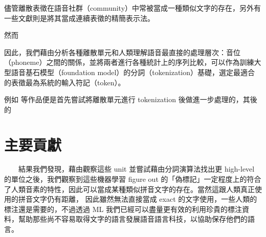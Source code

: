    儘管離散表徵在語音社群（community）中常被當成一種類似文字的存在，另外有一些文獻則是將其當成連續表徵的精簡表示法。

    然而

    因此，我們藉由分析各種離散單元和人類理解語音最直接的處理層次：音位（phoneme）之間的關係，並將兩者進行各種統計上的序列比較，可以作為訓練大型語音基石模型（foundation model）的分詞（tokenization）基礎，選定最適合的表徵最為系統的輸入符記（token）。

    例如 \cite{wu2023wav2seq} 等作品便是首先嘗試將離散單元進行 tokenization 後做進一步處理的，其後的



\section{主要貢獻}  %

　　結果我們發現，藉由觀察這些 unit 並嘗試藉由分詞演算法找出更 high-level 的單位之後，我們觀察到這些機器學習 figure out 的「偽標記」一定程度上的符合了人類音素的特性，因此可以當成某種類似拼音文字的存在。當然這跟人類真正使用的拼音文字仍有距離，
因此雖然無法直接當成 exact 的文字使用，一些人類的標注還是需要的，不過透過 ML 我們已經可以盡量更有效的利用珍貴的標注資料，幫助那些尚不容易取得文字的語言發展語音語言科技，以協助保存他們的語言。


